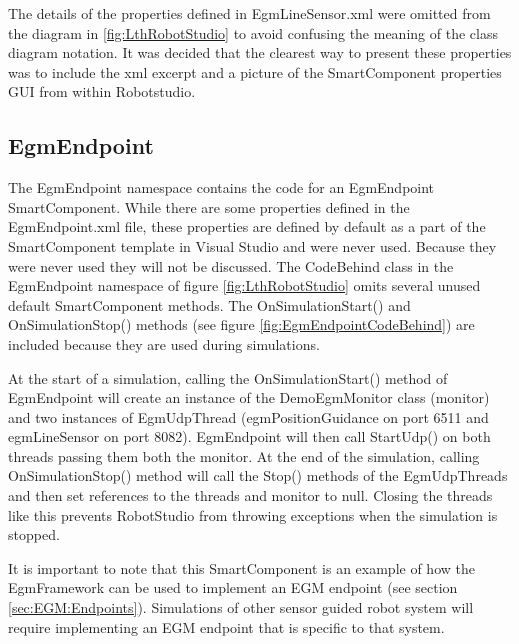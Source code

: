 \documentclass{cslthse-msc}
\begin{document}
The details of the properties defined in EgmLineSensor.xml were omitted from the diagram in \ref{fig:LthRobotStudio} to avoid confusing the meaning of the class diagram notation. It was decided that the clearest way to present these properties was to include the xml excerpt and a picture of the SmartComponent properties GUI from within Robotstudio. \par




\subsection{EgmEndpoint}
\label{sec:Result:LthRobotStudio:EgmEndpoint}
The EgmEndpoint namespace contains the code for an EgmEndpoint SmartComponent. While there are some properties defined in the EgmEndpoint.xml file, these properties are defined by default as a part of the SmartComponent template in Visual Studio and were never used. Because they were never used they will not be discussed. The CodeBehind class in the EgmEndpoint namespace of figure \ref{fig:LthRobotStudio} omits several unused default SmartComponent methods. The OnSimulationStart() and OnSimulationStop() methods (see figure \ref{fig:EgmEndpointCodeBehind}) are included because they are used during simulations.\par

At the start of a simulation, calling the OnSimulationStart() method of EgmEndpoint will create an instance of the DemoEgmMonitor class (monitor) and two instances of EgmUdpThread (egmPositionGuidance on port 6511 and egmLineSensor on port 8082). EgmEndpoint will then call StartUdp() on both threads passing them both the monitor. At the end of the simulation, calling OnSimulationStop() method will call the Stop() methods of the EgmUdpThreads and then set references to the threads and monitor to null. Closing the threads like this prevents RobotStudio from throwing exceptions when the simulation is stopped. \par

It is important to note that this SmartComponent is an example of how the EgmFramework can be used to implement an EGM endpoint (see section \ref{sec:EGM:Endpoints}). Simulations of other sensor guided robot system will require implementing an EGM endpoint that is specific to that system. 
\end{document}
